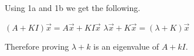 \newline
		Using 1a and 1b we get the following.
		\newline
		\begin{center}
		    $(A+KI)\vec{x}=A\vec{x}+KI\vec{x}$
		    \newline
		    $\lambda \vec{x}+K\vec{x}=(\lambda+K)\vec{x}$
		    \newline
		\end{center}
		Therefore proving $\lambda + k$ is an eigenvalue of $A + kI$.
